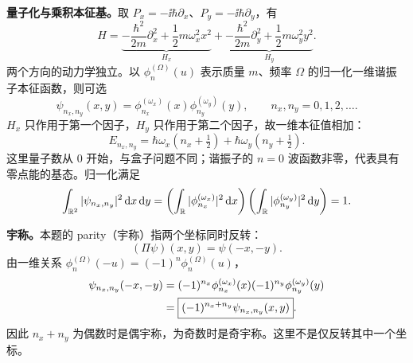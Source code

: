 \begin{checkedsolution}
\textbf{量子化与乘积本征基。}取 $P_x=-\ii\hbar\partial_x$、$P_y=-\ii\hbar\partial_y$，有
\begin{equation}
  H=\underbrace{-\frac{\hbar^2}{2m}\partial_x^2
        +\frac12m\omega_x^2x^2}_{H_x}
    +\underbrace{-\frac{\hbar^2}{2m}\partial_y^2
        +\frac12m\omega_y^2y^2}_{H_y}.
\end{equation}
两个方向的动力学独立。以 $\phi_n^{(\Omega)}(u)$ 表示质量 $m$、频率 $\Omega$ 的归一化一维谐振子本征函数，则可选
\begin{equation}
  \boxed{\psi_{n_x,n_y}(x,y)
    =\phi_{n_x}^{(\omega_x)}(x)\phi_{n_y}^{(\omega_y)}(y)},
  \qquad n_x,n_y=0,1,2,\ldots.
\end{equation}
$H_x$ 只作用于第一个因子，$H_y$ 只作用于第二个因子，故一维本征值相加：
\begin{equation}
  \boxed{E_{n_x,n_y}
    =\hbar\omega_x\left(n_x+\tfrac12\right)
      +\hbar\omega_y\left(n_y+\tfrac12\right)}.
\end{equation}
这里量子数从 $0$ 开始，与盒子问题不同；谐振子的 $n=0$ 波函数非零，代表具有零点能的基态。归一化满足
\begin{equation}
  \int_{\mathbb{R}^2}|\psi_{n_x,n_y}|^2\mathop{}\!\mathrm{d} x\mathop{}\!\mathrm{d} y
  =\left(\int_{\mathbb{R}}|\phi_{n_x}^{(\omega_x)}|^2\mathop{}\!\mathrm{d} x\right)
   \left(\int_{\mathbb{R}}|\phi_{n_y}^{(\omega_y)}|^2\mathop{}\!\mathrm{d} y\right)=1.
\end{equation}

\textbf{宇称。}本题的 parity（宇称）指两个坐标同时反转：
\begin{equation}
  (\Pi\psi)(x,y)=\psi(-x,-y).
\end{equation}
由一维关系 $\phi_n^{(\Omega)}(-u)=(-1)^n\phi_n^{(\Omega)}(u)$，
\begin{align}
  \psi_{n_x,n_y}(-x,-y)
  &=(-1)^{n_x}\phi_{n_x}^{(\omega_x)}(x)
    (-1)^{n_y}\phi_{n_y}^{(\omega_y)}(y)\notag\\
  &=\boxed{(-1)^{n_x+n_y}\psi_{n_x,n_y}(x,y)}.
\end{align}
因此 $n_x+n_y$ 为偶数时是偶宇称，为奇数时是奇宇称。这里不是仅反转其中一个坐标。


\end{checkedsolution}
